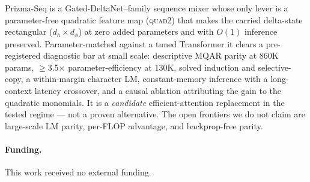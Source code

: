 \documentclass[11pt]{article}
\newcommand{\dphi}{d_{\phi}}
\newcommand{\dhd}{d_{h}}
\newcommand{\quadtwo}{\textsc{quad2}}
\begin{document}
Prizma-Seq is a Gated-DeltaNet--family sequence mixer whose only lever is a parameter-free quadratic
feature map (\quadtwo) that makes the carried delta-state rectangular ($\dhd\times\dphi$) at zero
added parameters and with $O(1)$ inference preserved. Parameter-matched against a tuned Transformer
it clears a pre-registered diagnostic bar at small scale: descriptive MQAR parity at 860K params,
$\geq$3.5$\times$ parameter-efficiency at 130K, solved induction and selective-copy, a within-margin
character LM, constant-memory inference with a long-context latency crossover, and a causal ablation
attributing the gain to the quadratic monomials. It is a \emph{candidate} efficient-attention
replacement in the tested regime --- not a proven alternative. The open frontiers we do not claim
are large-scale LM parity, per-FLOP advantage, and backprop-free parity.

\paragraph{Funding.} This work received no external funding.



\end{document}
